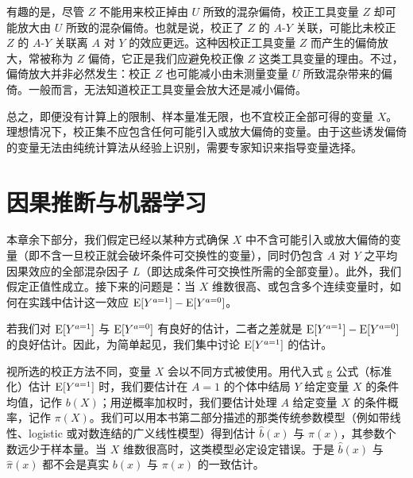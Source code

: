 \begin{figure}[htbp]
\centering
{}
\caption{}
\label{fig:18.7}
\end{figure}

有趣的是，尽管 $Z$ 不能用来校正掉由 $U$ 所致的混杂偏倚，校正工具变量 $Z$ 却可能放大由 $U$ 所致的混杂偏倚。也就是说，校正了 $Z$ 的 $A$-$Y$ 关联，可能比未校正 $Z$ 的 $A$-$Y$ 关联离 $A$ 对 $Y$ 的效应更远。这种因校正工具变量 $Z$ 而产生的偏倚放大，常被称为 $Z$ 偏倚，它正是我们应避免校正像 $Z$ 这类工具变量的理由。不过，偏倚放大并非必然发生：校正 $Z$ 也可能减小由未测量变量 $U$ 所致混杂带来的偏倚。一般而言，无法知道校正工具变量会放大还是减小偏倚。

总之，即便没有计算上的限制、样本量准无限，也不宜校正全部可得的变量 $X$。理想情况下，校正集不应包含任何可能引入或放大偏倚的变量。由于这些诱发偏倚的变量无法由纯统计算法从经验上识别，需要专家知识来指导变量选择。

\section{因果推断与机器学习}

本章余下部分，我们假定已经以某种方式确保 $X$ 中不含可能引入或放大偏倚的变量（即不含一旦校正就会破坏条件可交换性的变量），同时仍包含 $A$ 对 $Y$ 之平均因果效应的全部混杂因子 $L$（即达成条件可交换性所需的全部变量）。此外，我们假定正值性成立。接下来的问题是：当 $X$ 维数很高、或包含多个连续变量时，如何在实践中估计这一效应 $\mathrm{E}[Y^{a=1}]-\mathrm{E}[Y^{a=0}]$。

若我们对 $\mathrm{E}[Y^{a=1}]$ 与 $\mathrm{E}[Y^{a=0}]$ 有良好的估计，二者之差就是 $\mathrm{E}[Y^{a=1}]-\mathrm{E}[Y^{a=0}]$ 的良好估计。因此，为简单起见，我们集中讨论 $\mathrm{E}[Y^{a=1}]$ 的估计。

视所选的校正方法不同，变量 $X$ 会以不同方式被使用。用代入式 g 公式（标准化）估计 $\mathrm{E}[Y^{a=1}]$ 时，我们要估计在 $A=1$ 的个体中结局 $Y$ 给定变量 $X$ 的条件均值，记作 $b(X)$；用逆概率加权时，我们要估计处理 $A$ 给定变量 $X$ 的条件概率，记作 $\pi(X)$。我们可以用本书第二部分描述的那类传统参数模型（例如带线性、logistic 或对数连结的广义线性模型）得到估计 $\hat b(x)$ 与 $\hat\pi(x)$，其参数个数远少于样本量。当 $X$ 维数很高时，这类模型必定设定错误。于是 $\hat b(x)$ 与 $\hat\pi(x)$ 都不会是真实 $b(x)$ 与 $\pi(x)$ 的一致估计。

